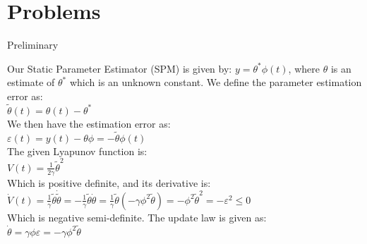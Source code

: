 \section*{Problems}

\newcommand{\vt}{$\theta$}
\newcommand{\vin}{$\in$}
\newcommand{\veps}{$\varepsilon$}
\newcommand{\Lagr}{\mathcal{L}}

\Large{Preliminary}

Our Static Parameter Estimator (SPM) is given by: $y=\theta^* \phi(t)$, where $\theta$ is an estimate of $\theta^*$ which is an unknown constant.  
We define the parameter estimation error as: \\ 
\begin{math}
    \tilde{\theta}(t) = \theta(t) - \theta ^*
\end{math} 
\\
We then have the estimation error as: \\
\begin{math}
    \varepsilon(t) = y(t) - \theta \phi = -\tilde{\theta}\phi(t)
\end{math}\\
The given Lyapunov function is: \\
\begin{math}
    V(t) = \frac{1}{2 \gamma} \tilde{\theta}^2
\end{math} \\

Which is positive definite, and its derivative is: \\
\begin{math}
    \dot{V}(t) = \frac{1}{\gamma} \tilde{\theta} \dot{\tilde{\theta}} = -\frac{1}{\gamma} \tilde{\theta} \dot{\theta} = \frac{1}{\gamma} \tilde{\theta} (-\gamma \phi ^2 \tilde{\theta}) = -\phi^2 \tilde{\theta}^2 = -\varepsilon^2 \leq 0
\end{math} \\
Which is negative semi-definite. The update law is given as: \\
\begin{math}
    \dot{\theta} = \gamma \phi \varepsilon = - \gamma \phi^2 \tilde{\theta}
\end{math} \\


